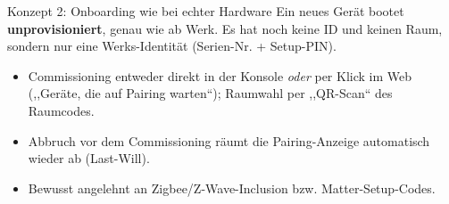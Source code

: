 \documentclass[aspectratio=169,11pt]{beamer}
\begin{document}
\begin{frame}{Konzept 2: Onboarding wie bei echter Hardware}
  Ein neues Ger\"at bootet \textbf{unprovisioniert}, genau wie ab Werk. Es hat noch keine
  ID und keinen Raum, sondern nur eine Werks-Identit\"at (Serien-Nr. + Setup-PIN).

  \vspace{0.8em}
  \begin{center}
  \end{center}

  \vspace{0.6em}
  \begin{itemize}
    \item Commissioning entweder direkt in der Konsole \emph{oder} per Klick im Web
          (,,Ger\"ate, die auf Pairing warten``); Raumwahl per ,,QR-Scan`` des Raumcodes.
    \item Abbruch vor dem Commissioning r\"aumt die Pairing-Anzeige automatisch wieder ab (Last-Will).
    \item Bewusst angelehnt an Zigbee/Z-Wave-Inclusion bzw. Matter-Setup-Codes.
  \end{itemize}
\end{frame}
\end{document}
